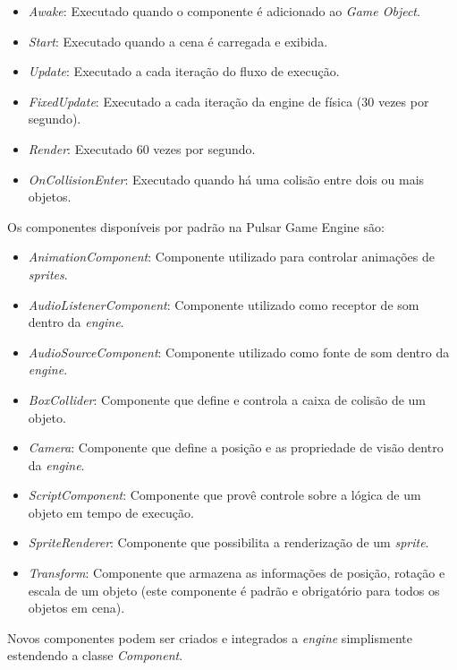 \documentclass[12pt,	openright, twoside,	a4paper, english, french, spanish, brazil]{abntex2}
\begin{document}
\begin{itemize}
\item \textit{Awake}: Executado quando o componente é adicionado ao \textit{Game Object}.
\item \textit{Start}: Executado quando a cena é carregada e exibida.
\item \textit{Update}: Executado a cada iteração do fluxo de execução.
\item \textit{FixedUpdate}: Executado a cada iteração da engine de física (30 vezes por segundo).
\item \textit{Render}: Executado 60 vezes por segundo.
\item \textit{OnCollisionEnter}: Executado quando há uma colisão entre dois ou mais objetos.
\end{itemize}

Os componentes disponíveis por padrão na Pulsar Game Engine são:

\begin{itemize}
\item \textit{AnimationComponent}: Componente utilizado para controlar animações de \textit{sprites}. 
\item \textit{AudioListenerComponent}: Componente utilizado como receptor de som dentro da \textit{engine}.
\item \textit{AudioSourceComponent}: Componente utilizado como fonte de som dentro da \textit{engine}.
\item \textit{BoxCollider}: Componente que define e controla a caixa de colisão de um objeto.
\item \textit{Camera}: Componente que define a posição e as propriedade de visão dentro da \textit{engine}.
\item \textit{ScriptComponent}: Componente que provê controle sobre a lógica de um objeto em tempo de execução.
\item \textit{SpriteRenderer}: Componente que possibilita a renderização de um \textit{sprite}.
\item \textit{Transform}: Componente que armazena as informações de posição, rotação e escala de um objeto (este componente é padrão e obrigatório para todos os objetos em cena).
\end{itemize}

Novos componentes podem ser criados e integrados a \textit{engine} simplismente estendendo a classe \textit{Component}.

%
%
\end{document}
